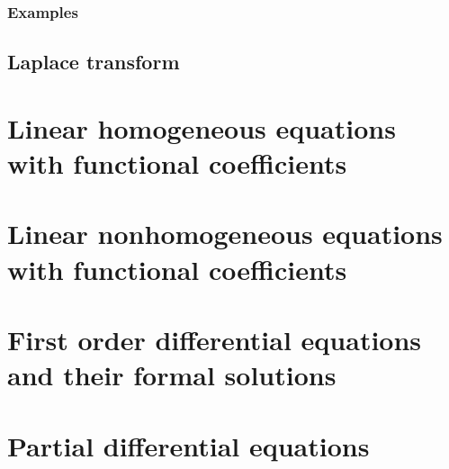 \subsection{Examples}

\section{Laplace transform}

\chapter{Linear homogeneous equations with functional coefficients}
\chapter{Linear nonhomogeneous equations with functional coefficients}
\label{chapter: Linear nonhomogeneous equations with functional coefficients}
\chapter{First order differential equations and their formal solutions}
\chapter{Partial differential equations}
